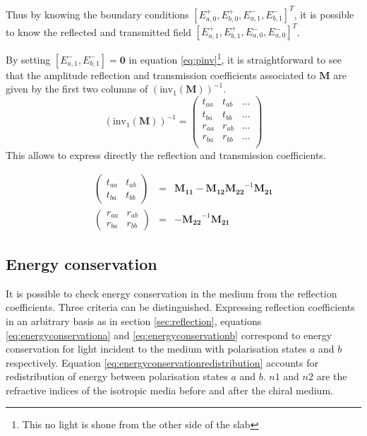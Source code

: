 Thus by knowing the boundary conditions $[E_{a,0}^+, E_{b,0}^+, E_{a,1}^-, E_{b,1}^-]^T$, it is possible to know the reflected and transmitted field $[E_{a,1}^+,E_{b,1}^+,E_{a,0}^-,E_{a,0}^-]^T$. 

By setting $[E_{a,1}^-, E_{b,1}^-] = \bm{0}$ in equation \ref{eq:pinv}\footnote{This no light is shone from the other side of the slab}, it is straightforward to see that the amplitude reflection and transmission coefficients associated to $\bm{M}$ are given by the first two columns of $\left(\text{inv}_1(\bm{M})\right)^{-1}$.
\begin{equation}
\left(\text{inv}_1(\bm{M})\right)^{-1} = \begin{pmatrix}
t_{aa} & t_{ab} & \ldots \\
t_{ba} & t_{bb} & \ldots \\
r_{aa} & r_{ab} & \ldots \\
r_{ba} & r_{bb} &  \ldots\\
\end{pmatrix}
\end{equation}
%
This allows to express directly the reflection and transmission coefficients.

\begin{eqnarray}
\begin{pmatrix}
t_{aa} & t_{ab} \\
t_{ba} & t_{bb}
\end{pmatrix} &=& \bm{M_{11}} - \bm{M_{12}}\bm{M_{22}}^{-1}\bm{M_{21}} \label{eq:transmission}\\
\begin{pmatrix}
r_{aa} & r_{ab} \\
r_{ba} & r_{bb}
\end{pmatrix} &=& -\bm{M_{22}}^{-1}\bm{M_{21}}\label{eq:reflection}
\end{eqnarray}

\subsection{Energy conservation}

It is possible to check energy conservation in the medium from the reflection coefficients. Three criteria can be distinguished\cite{mccall_properties_2009}.  Expressing reflection coefficients in an arbitrary basis as in section \ref{sec:reflection}, equations \ref{eq:energyconservationa} and \ref{eq:energyconservationb} correspond to energy conservation for light incident to the medium with polarisation states $a$ and $b$ respectively. Equation \ref{eq:energyconservationredistribution} accounts for redistribution of energy between polarisation states $a$ and $b$. $n1$ and $n2$ are the refractive indices of the isotropic media before and after the chiral medium.

